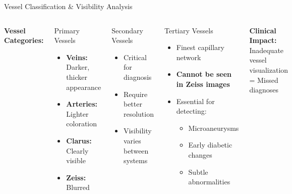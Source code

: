\documentclass[aspectratio=169]{beamer}
\begin{document}
\begin{frame}{Vessel Classification \& Visibility Analysis}
\begin{columns}[T]
\textbf{Vessel Categories:}

\begin{block}{Primary Vessels}
\begin{itemize}
    \item \textbf{Veins:} Darker, thicker appearance
    \item \textbf{Arteries:} Lighter coloration
    \item \textcolor{green!50!black}{\textbf{Clarus:}} Clearly visible
    \item \textcolor{red!70!black}{\textbf{Zeiss:}} Blurred
\end{itemize}
\end{block}

\begin{block}{Secondary Vessels}
\begin{itemize}
    \item Critical for diagnosis
    \item Require better resolution
    \item Visibility varies between systems
\end{itemize}
\end{block}

\begin{block}{Tertiary Vessels}
\begin{itemize}
    \item Finest capillary network
    \item \textcolor{red!70!black}{\textbf{Cannot be seen in Zeiss images}}
    \item Essential for detecting:
    \begin{itemize}
        \item Microaneurysms
        \item Early diabetic changes
        \item Subtle abnormalities
    \end{itemize}
\end{itemize}
\end{block}

\vspace{0.3cm}
\textbf{Clinical Impact:}\\
Inadequate vessel visualization = Missed diagnoses
\end{columns}
\end{frame}
\end{document}
